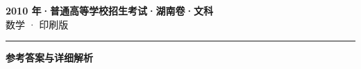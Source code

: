 \documentclass[zihao=5, a4paper]{ctexart}
\begin{document}
\begin{center}
  {\Large\bfseries 2010 年·普通高等学校招生考试·湖南卷·文科}\\[4pt]
  {\large 数学 · 印刷版}
\end{center}
\medskip
{}

\par\bigskip\hrule\bigskip
{}
\begin{center}{\large\bfseries 参考答案与详细解析}\end{center}
\smallskip

\end{document}
